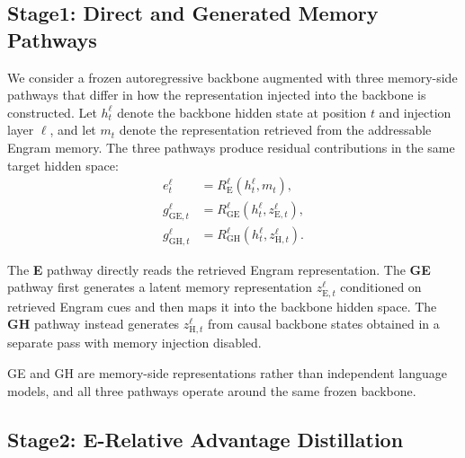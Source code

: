 \documentclass{article}
\begin{document}
\subsection{Stage1: Direct and Generated Memory Pathways}
\label{sec:pathways}

We consider a frozen autoregressive backbone augmented with three
memory-side pathways that differ in how the representation injected into the
backbone is constructed.
%
Let $h_t^\ell$ denote the backbone hidden state at position $t$ and injection
layer $\ell$, and let $m_t$ denote the representation retrieved from the
addressable Engram memory.
%
The three pathways produce residual contributions in the same target hidden
space:
\begin{align}
e_t^\ell
&=
R_{\mathrm{E}}^\ell
\left(h_t^\ell, m_t\right),
\\
g_{\mathrm{GE},t}^\ell
&=
R_{\mathrm{GE}}^\ell
\left(h_t^\ell, z_{\mathrm{E},t}^\ell\right),
\\
g_{\mathrm{GH},t}^\ell
&=
R_{\mathrm{GH}}^\ell
\left(h_t^\ell, z_{\mathrm{H},t}^\ell\right).
\end{align}

The \textbf{E} pathway directly reads the retrieved Engram representation.
The \textbf{GE} pathway first generates a latent memory representation
$z_{\mathrm{E},t}^\ell$ conditioned on retrieved Engram cues and then maps it
into the backbone hidden space.
The \textbf{GH} pathway instead generates
$z_{\mathrm{H},t}^\ell$ from causal backbone states obtained in a separate
pass with memory injection disabled.

GE and GH are memory-side representations rather than independent language
models, and all three pathways operate around the same frozen backbone.

\subsection{Stage2: E-Relative Advantage Distillation}
\label{sec:advantage}
\end{document}
